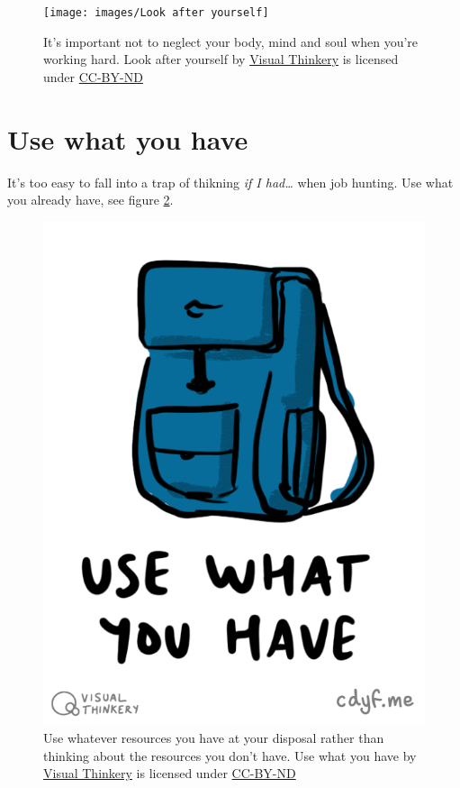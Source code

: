 \documentclass[
]{book}
\begin{document}
\begin{figure}

{\centering \texttt{[image: images/Look after yourself]} 

}

\caption{It's important not to neglect your body, mind and soul when you're working hard. Look after yourself by \href{https://visualthinkery.com}{Visual Thinkery} is licensed under \href{https://creativecommons.org/licenses/by-nd/4.0/}{CC-BY-ND}}\label{fig:lookafter-again-fig}
\end{figure}



\hypertarget{gregwilson}{%
\section{Use what you have}\label{gregwilson}}

It's too easy to fall into a trap of thikning \emph{if I had\ldots{}} when job hunting. Use what you already have, see figure \ref{fig:usewhatyouhave-fig}.

\begin{figure}

{\centering \includegraphics[width=0.5\linewidth]{images/Use what you have} 

}

\caption{Use whatever resources you have at your disposal rather than thinking about the resources you don't have. Use what you have by \href{https://visualthinkery.com}{Visual Thinkery} is licensed under \href{https://creativecommons.org/licenses/by-nd/4.0/}{CC-BY-ND}}\label{fig:usewhatyouhave-fig}
\end{figure}
\end{document}
